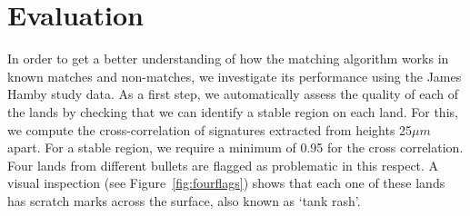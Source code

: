 \documentclass[aoas, preprint]{imsart}\usepackage[]{graphicx}\usepackage[]{color}
\begin{document}
\section{Evaluation}
In order to get a better understanding of  how  the matching algorithm works in known matches and non-matches, we investigate its performance using the James Hamby study data. As a first step, we automatically assess the quality of each of the lands by  checking that we can identify a stable region on each land. For this, we compute the cross-correlation of signatures extracted from heights 25$\mu m$ apart. For a stable region, we require a minimum of 0.95 for the cross correlation. Four lands from different bullets are flagged as problematic in this respect. A visual inspection (see Figure~\ref{fig:fourflags}) shows that each one of these lands has scratch marks across the surface, also known as `tank rash'.
%
\end{document}
